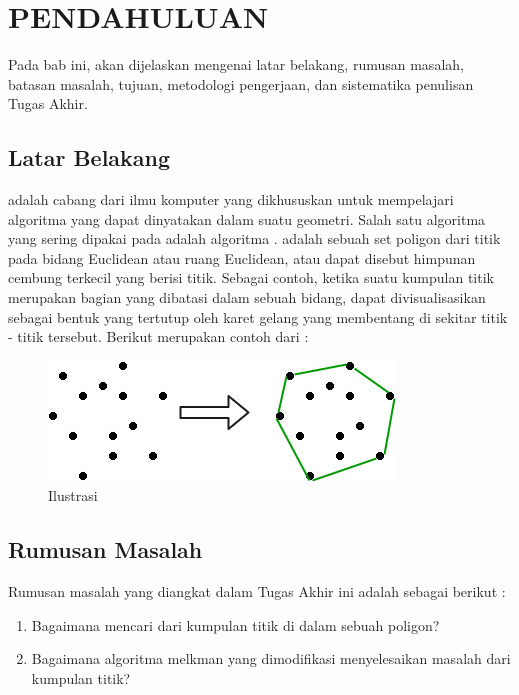 \vspace{0ex}
\chapter {PENDAHULUAN}

Pada bab ini, akan dijelaskan mengenai latar belakang, rumusan masalah, batasan masalah, tujuan, metodologi pengerjaan, dan sistematika penulisan Tugas Akhir.

\section{Latar Belakang}

\par \CG adalah cabang dari ilmu komputer yang dikhususkan untuk mempelajari algoritma yang dapat dinyatakan dalam suatu geometri. Salah satu algoritma yang sering dipakai pada \CG adalah algoritma \CG. \CH adalah sebuah set poligon dari titik pada bidang Euclidean atau ruang Euclidean, atau dapat disebut himpunan cembung terkecil yang berisi titik. Sebagai contoh, ketika suatu kumpulan titik merupakan bagian yang dibatasi dalam sebuah bidang, \CH dapat divisualisasikan sebagai bentuk yang tertutup oleh karet gelang yang membentang di sekitar titik - titik tersebut. Berikut merupakan contoh dari \CH :
\begin{figure}
	\Centering
	\includegraphics [width=\textwidth]{bab1/img/ilustrasi-convex-hull}
	\caption {Ilustrasi \CH}
	\label {fig:ilustrasi-convex-hull}
\end{figure}


\section {Rumusan Masalah}

Rumusan masalah yang diangkat dalam Tugas Akhir ini adalah sebagai berikut :

\begin {enumerate}
    \item Bagaimana mencari \RCH dari kumpulan titik di dalam sebuah poligon?
    \item Bagaimana algoritma melkman yang dimodifikasi menyelesaikan masalah \RCH dari kumpulan titik?
\end {enumerate}

